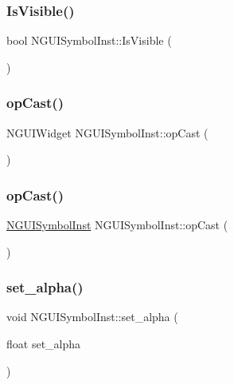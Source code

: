 \subsubsection{\texorpdfstring{Is\+Visible()}{IsVisible()}}
{\footnotesize\ttfamily bool N\+G\+U\+I\+Symbol\+Inst\+::\+Is\+Visible (\begin{DoxyParamCaption}{ }\end{DoxyParamCaption})}

\hypertarget{class_n_g_u_i_symbol_inst_ad41bdaae76f47320fdfe84fac921bf47}{}\label{class_n_g_u_i_symbol_inst_ad41bdaae76f47320fdfe84fac921bf47} 
\subsubsection{\texorpdfstring{op\+Cast()}{opCast()}\hspace{0.1cm}{\footnotesize\ttfamily [1/2]}}
{\footnotesize\ttfamily N\+G\+U\+I\+Widget N\+G\+U\+I\+Symbol\+Inst\+::op\+Cast (\begin{DoxyParamCaption}{ }\end{DoxyParamCaption})}

\hypertarget{class_n_g_u_i_symbol_inst_a2338c9411dca8509d132e711082850b8}{}\label{class_n_g_u_i_symbol_inst_a2338c9411dca8509d132e711082850b8} 
\subsubsection{\texorpdfstring{op\+Cast()}{opCast()}\hspace{0.1cm}{\footnotesize\ttfamily [2/2]}}
{\footnotesize\ttfamily \hyperlink{class_n_g_u_i_symbol_inst}{N\+G\+U\+I\+Symbol\+Inst} N\+G\+U\+I\+Symbol\+Inst\+::op\+Cast (\begin{DoxyParamCaption}{ }\end{DoxyParamCaption})}

\hypertarget{class_n_g_u_i_symbol_inst_a04185d4ab2b317522ae52b5bbc62233f}{}\label{class_n_g_u_i_symbol_inst_a04185d4ab2b317522ae52b5bbc62233f} 
\subsubsection{\texorpdfstring{set\+\_\+alpha()}{set\_alpha()}}
{\footnotesize\ttfamily void N\+G\+U\+I\+Symbol\+Inst\+::set\+\_\+alpha (\begin{DoxyParamCaption}\item[{float}]{set\+\_\+alpha }\end{DoxyParamCaption})}

